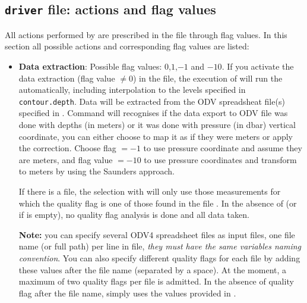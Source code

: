 \pagebreak 

\subsection{{\tt driver} file: actions and flag values\label{driverflags}}

All actions performed by  are prescribed in the file  through flag values. In this section all possible actions and corresponding flag values are listed:

\begin{itemize}
\item {\bf Data extraction}: Possible flag values: $0$,$1$,$-1$ and $-10$. If you activate the data extraction (flag value $\neq 0$) in the  file, the execution of  will run the  automatically, including interpolation to the levels specified in {\tt contour.depth}. Data will be extracted from the ODV spreadsheat file(s) specified in . Command  will recognises if the data export to ODV file was done with depths (in meters) or it was done with pressure (in dbar) vertical coordinate, you can either choose to map it as if they were meters or apply the \citet{SAUNDERS81} correction. Choose flag $=-1$ to use pressure coordinate and assume they are meters, and flag value $=-10$ to use pressure coordinates and transform to meters by using the Saunders approach.

If there is a  file, the selection with  will only use those measurements for which the quality flag is one of those found in the file . In the absence of  (or if  is empty), no quality flag analysis is done and all data taken.

{\bf Note:} you can specify several ODV4 spreadsheet files as input files, one file name (or full path) per line in  file, {\it they must have the same variables naming convention}. You can also specify different quality flags for each file by adding these values after the file name (separated by a space). At the moment, a maximum of two quality flags per file is admitted. In the absence of quality flag after the file name,  simply uses the values provided in .



\end{itemize}
